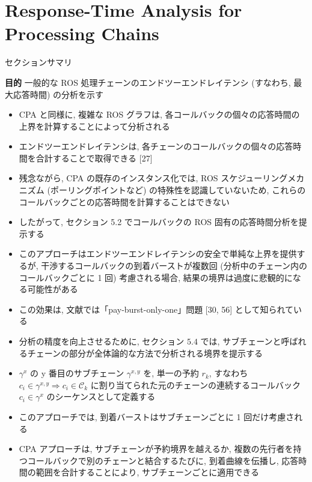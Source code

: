 
\section{Response-Time Analysis for Processing Chains}
\label{sec: response-time analysis for processing chains}

\begin{frame}{セクションサマリ}
    \begin{itembox}[l]{\textbf{目的}}
        一般的な ROS 処理チェーンのエンドツーエンドレイテンシ (すなわち, 最大応答時間) の分析を示す
    \end{itembox}
\end{frame}

\begin{frame}{}
    \begin{itemize}
        \item CPA と同様に, 複雑な ROS グラフは, 各コールバックの個々の応答時間の上界を計算することによって分析される
\item エンドツーエンドレイテンシは, 各チェーンのコールバックの個々の応答時間を合計することで取得できる [27]
\item 残念ながら, CPA の既存のインスタンス化では, ROS スケジューリングメカニズム (ポーリングポイントなど) の特殊性を認識していないため, これらのコールバックごとの応答時間を計算することはできない
\item したがって, セクション 5.2 でコールバックの ROS 固有の応答時間分析を提示する
    \end{itemize}
\end{frame}

\begin{frame}{}
    \begin{itemize}
        \item このアプローチはエンドツーエンドレイテンシの安全で単純な上界を提供するが, 干渉するコールバックの到着バーストが複数回 (分析中のチェーン内のコールバックごとに 1 回) 考慮される場合, 結果の境界は過度に悲観的になる可能性がある
\item この効果は, 文献では「pay-burst-only-one」問題 [30, 56] として知られている
\item 分析の精度を向上させるために, セクション $5.4$ では, サブチェーンと呼ばれるチェーンの部分が全体論的な方法で分析される境界を提示する
\item $\gamma^{x}$ の y 番目のサブチェーン $\gamma^{x, y}$ を, 単一の予約 $r_{k}$, すなわち $c_{i} \in \gamma^{x, y} \Rightarrow c_{i} \in \mathcal{C}_{k}$ に割り当てられた元のチェーンの連続するコールバック $c_{i} \in \gamma^{x}$ のシーケンスとして定義する
\item このアプローチでは, 到着バーストはサブチェーンごとに 1 回だけ考慮される
\item CPA アプローチは, サブチェーンが予約境界を越えるか, 複数の先行者を持つコールバックで別のチェーンと結合するたびに, 到着曲線を伝播し, 応答時間の範囲を合計することにより, サブチェーンごとに適用できる
    \end{itemize}
\end{frame}


